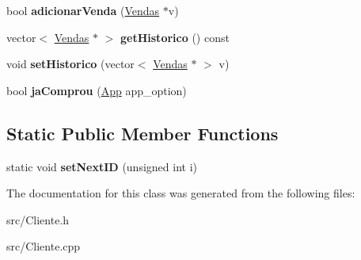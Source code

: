 \begin{DoxyCompactItemize}
\item 
\hypertarget{class_cliente_a56fd118de07cc418426f5f54c3f4935f}{bool {\bfseries adicionar\+Venda} (\hyperlink{class_vendas}{Vendas} $\ast$v)}\label{class_cliente_a56fd118de07cc418426f5f54c3f4935f}

\item 
\hypertarget{class_cliente_ad2d27cf5a6a187c6a5faa4fee88cfd9f}{vector$<$ \hyperlink{class_vendas}{Vendas} $\ast$ $>$ {\bfseries get\+Historico} () const }\label{class_cliente_ad2d27cf5a6a187c6a5faa4fee88cfd9f}

\item 
\hypertarget{class_cliente_a340b3c4b25009f1020984743eb371208}{void {\bfseries set\+Historico} (vector$<$ \hyperlink{class_vendas}{Vendas} $\ast$ $>$ v)}\label{class_cliente_a340b3c4b25009f1020984743eb371208}

\item 
\hypertarget{class_cliente_a452fdbf8832d1f7dd89a76b876aed67d}{bool {\bfseries ja\+Comprou} (\hyperlink{class_app}{App} app\+\_\+option)}\label{class_cliente_a452fdbf8832d1f7dd89a76b876aed67d}

\end{DoxyCompactItemize}
\subsection*{Static Public Member Functions}
\begin{DoxyCompactItemize}
\item 
\hypertarget{class_cliente_a072628868d4165e0b7915d975621bc8a}{static void {\bfseries set\+Next\+I\+D} (unsigned int i)}\label{class_cliente_a072628868d4165e0b7915d975621bc8a}

\end{DoxyCompactItemize}


The documentation for this class was generated from the following files\+:\begin{DoxyCompactItemize}
\item 
src/Cliente.\+h\item 
src/Cliente.\+cpp\end{DoxyCompactItemize}

